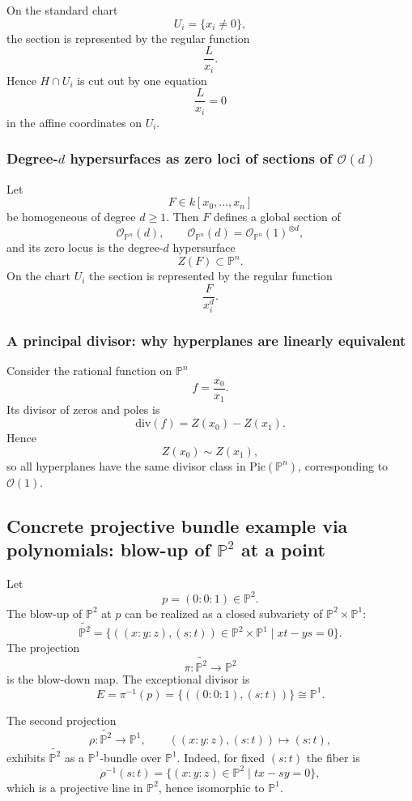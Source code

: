 \documentclass[12pt,a4paper]{article}
\theoremstyle{plain}
\theoremstyle{definition}      %
\begin{document}
On the standard chart
\[
U_i=\{x_i\neq 0\},
\]
the section is represented by the regular function
\[
\frac{L}{x_i}.
\]
Hence $H\cap U_i$ is cut out by one equation
\[
\frac{L}{x_i}=0
\]
in the affine coordinates on $U_i$.

\subsubsection*{Degree-$d$ hypersurfaces as zero loci of sections of $\mathcal O(d)$}

Let
\[
F\in k[x_0,\dots,x_n]
\]
be homogeneous of degree $d\ge 1$.
Then $F$ defines a global section of
\[
\mathcal O_{\mathbb P^n}(d),
\qquad
\mathcal O_{\mathbb P^n}(d)=\mathcal O_{\mathbb P^n}(1)^{\otimes d},
\]
and its zero locus is the degree-$d$ hypersurface
\[
Z(F)\subset \mathbb P^n.
\]
On the chart $U_i$ the section is represented by the regular function
\[
\frac{F}{x_i^{d}}.
\]

\subsubsection*{A principal divisor: why hyperplanes are linearly equivalent}

Consider the rational function on $\mathbb P^n$
\[
f=\frac{x_0}{x_1}.
\]
Its divisor of zeros and poles is
\[
\mathrm{div}(f)=Z(x_0)-Z(x_1).
\]
Hence
\[
Z(x_0)\sim Z(x_1),
\]
so all hyperplanes have the same divisor class in $\mathrm{Pic}(\mathbb P^n)$, corresponding to $\mathcal O(1)$.

\subsection*{Concrete projective bundle example via polynomials: blow-up of $\mathbb P^2$ at a point}

Let
\[
p=(0:0:1)\in \mathbb P^2.
\]
The blow-up of $\mathbb P^2$ at $p$ can be realized as a closed subvariety of $\mathbb P^2\times \mathbb P^1$:
\[
\widetilde{\mathbb P^2}
=
\bigl\{((x:y:z),(s:t))\in \mathbb P^2\times\mathbb P^1 \mid xt-ys=0\bigr\}.
\]
The projection
\[
\pi:\widetilde{\mathbb P^2}\to \mathbb P^2
\]
is the blow-down map.
The exceptional divisor is
\[
E=\pi^{-1}(p)=\{((0:0:1),(s:t))\}\cong \mathbb P^1.
\]

The second projection
\[
\rho:\widetilde{\mathbb P^2}\to \mathbb P^1,
\qquad
((x:y:z),(s:t))\longmapsto (s:t),
\]
exhibits $\widetilde{\mathbb P^2}$ as a $\mathbb P^1$-bundle over $\mathbb P^1$.
Indeed, for fixed $(s:t)$ the fiber is
\[
\rho^{-1}(s:t)
=
\{(x:y:z)\in \mathbb P^2 \mid tx-sy=0\},
\]
which is a projective line in $\mathbb P^2$, hence isomorphic to $\mathbb P^1$.

	
\end{document}

